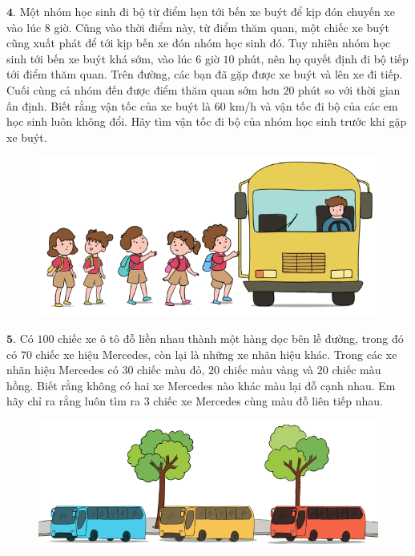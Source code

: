 \begin{multicols}{2}
\begin{figure}[H]
		\vspace*{-15pt}
	\end{figure}
	$\pmb{4.}$ Một nhóm học sinh đi bộ từ điểm hẹn tới bến xe buýt để kịp đón chuyến xe vào lúc $8$ giờ. Cũng vào thời điểm này, từ điểm thăm quan, một chiếc xe buýt cũng xuất phát để tới kịp bến xe đón nhóm học sinh đó. Tuy  nhiên nhóm học sinh tới bến xe buýt khá sớm, vào lúc $6$ giờ $10$ phút, nên họ quyết định đi bộ tiếp tới điểm thăm quan. Trên đường, các bạn đã gặp được xe buýt và lên xe đi tiếp.  Cuối cùng cả nhóm đến được điểm thăm quan sớm hơn $20$ phút so với thời gian ấn định. Biết rằng vận tốc của xe buýt là $60$ km/h và vận tốc đi bộ của các em học sinh luôn không đổi. Hãy tìm vận tốc đi bộ của nhóm học sinh trước khi gặp xe buýt.
	\begin{figure}[H]
		\centering
		\captionsetup{labelformat= empty, justification=centering}
		\includegraphics[width=1\linewidth]{Pi5_bai4}
		\vspace*{-10pt}
	\end{figure}
	$\pmb{5.}$ 	Có $100$ chiếc xe ô tô đỗ liền nhau thành một hàng dọc bên lề đường, trong đó có $70$ chiếc xe hiệu Mercedes, còn lại là những xe nhãn hiệu khác. Trong các xe nhãn hiệu Mercedes có $30$ chiếc màu đỏ, $20$ chiếc màu vàng và $20$ chiếc màu hồng. Biết rằng không có hai xe Mercedes nào khác màu lại đỗ cạnh nhau. Em hãy chỉ ra rằng luôn tìm ra $3$ chiếc xe Mercedes cùng màu đỗ liên tiếp nhau.
	\begin{figure}[H]
		\centering
		\vspace*{-5pt}
		\captionsetup{labelformat= empty, justification=centering}
		\includegraphics[width=1\linewidth]{Pi5_bai5}

\end{figure}
\end{multicols}
